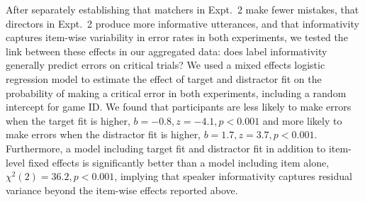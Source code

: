 \documentclass[manuscript]{stjour}
\begin{document}
After separately establishing that matchers in Expt.~2 make fewer mistakes, that directors in Expt.~2 produce more informative utterances, and that informativity captures item-wise variability in error rates in both experiments, we tested the link between these effects in our aggregated data: does label informativity generally predict errors on critical trials? We used a mixed effects logistic regression model to estimate the effect of target and distractor fit on the probability of making a critical error in both experiments, including a random intercept for game ID. We found that participants are less likely to make errors when the target fit is higher, $b = -0.8, z = -4.1, p < 0.001$ and more likely to make errors when the distractor fit is higher, $b = 1.7, z = 3.7, p < 0.001$. Furthermore, a model including target fit and distractor fit in addition to item-level fixed effects is significantly better than a model including item alone, $\chi^2(2) = 36.2, p < 0.001$, implying that speaker informativity captures residual variance beyond the item-wise effects reported above.

\end{document}
